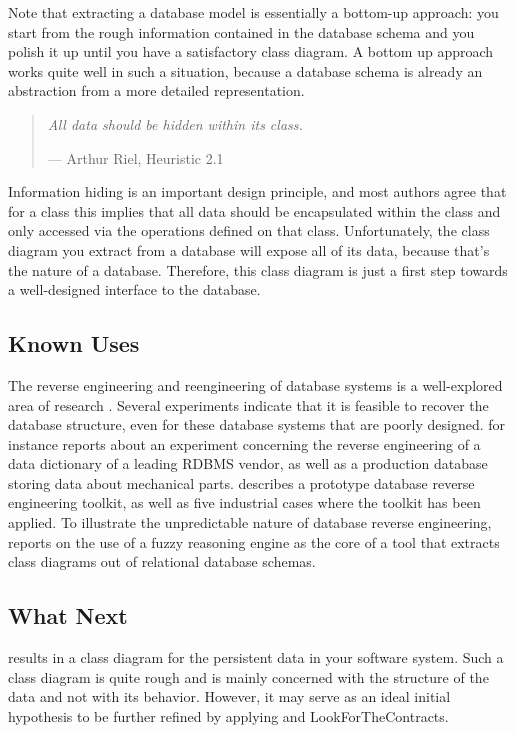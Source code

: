 \documentclass[a4paper,10pt,twoside]{book}
\begin{document}
Note that extracting a database model is essentially a bottom-up approach: you start from 
the rough information contained in the database schema and you polish it up until you have 
a satisfactory class diagram. A bottom up approach works quite well in such a situation, 
because a database schema is already an abstraction from a more detailed representation.

\begin{quotation}
\noindent
\emph{All data should be hidden within its class.}

\hfill --- Arthur Riel, Heuristic 2.1 \cite{Riel96a}
\end{quotation}

Information hiding is an important design principle, and most authors agree that for a 
class this implies that all data should be encapsulated within the class and only accessed 
via the operations defined on that class. Unfortunately, the class diagram you extract from 
a database will expose all of its data, because that's the nature of a database. Therefore, 
this class diagram is just a first step towards a well-designed interface to the database.

\subsection*{Known Uses}

The reverse engineering and reengineering of database systems is a well-explored area of 
research \cite{Arno92a} \cite{Mull00a}. Several experiments indicate that it is feasible to 
recover the database structure, even for these database systems that are poorly designed. 
\cite{Prem94a} for instance reports about an experiment concerning the reverse engineering 
of a data dictionary of a leading RDBMS vendor, as well as a production database storing 
data about mechanical parts. \cite{Hain96a} describes a prototype database reverse 
engineering toolkit, as well as five industrial cases where the toolkit has been applied. 
To illustrate the unpredictable nature of database reverse engineering, \cite{Jahn97b} 
reports on the use of a fuzzy reasoning engine as the core of a tool that extracts class 
diagrams out of relational database schemas.

\subsection*{What Next}

 results in a class diagram 
for the persistent data in your software system. Such a class diagram is quite rough and is 
mainly concerned with the structure of the data and not with its behavior. However, it may 
serve as an ideal initial hypothesis to be further refined by applying  and 
{LookForTheContracts}.
\end{document}
